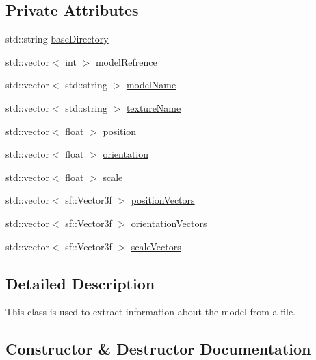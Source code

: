 \subsection*{Private Attributes}
\begin{DoxyCompactItemize}
\item 
std\+::string \hyperlink{class_model_extractor_a97d4cac0fe91a0bb91a736f780c8740a}{base\+Directory}
\item 
std\+::vector$<$ int $>$ \hyperlink{class_model_extractor_a507d1a9066e1a5eca6ccabad7a678432}{model\+Refrence}
\item 
std\+::vector$<$ std\+::string $>$ \hyperlink{class_model_extractor_a0167c9a9eab2cd5478f4399a55328db6}{model\+Name}
\item 
std\+::vector$<$ std\+::string $>$ \hyperlink{class_model_extractor_ab1c441c2915f84360bc00b331b301eb2}{texture\+Name}
\item 
std\+::vector$<$ float $>$ \hyperlink{class_model_extractor_a561a692a6b37b8ef36020b918a63066c}{position}
\item 
std\+::vector$<$ float $>$ \hyperlink{class_model_extractor_ae0be066e55d4910fa79d7b3da45100d0}{orientation}
\item 
std\+::vector$<$ float $>$ \hyperlink{class_model_extractor_ae9815e4d0f6783e6ba92961956c7d932}{scale}
\item 
std\+::vector$<$ sf\+::\+Vector3f $>$ \hyperlink{class_model_extractor_a9427f6c960e71ea44371014aa12835cf}{position\+Vectors}
\item 
std\+::vector$<$ sf\+::\+Vector3f $>$ \hyperlink{class_model_extractor_a619bae88ba670b8652dc608a482b23fc}{orientation\+Vectors}
\item 
std\+::vector$<$ sf\+::\+Vector3f $>$ \hyperlink{class_model_extractor_a03bcd2b8bcfffe704b07583ee597b65e}{scale\+Vectors}
\end{DoxyCompactItemize}


\subsection{Detailed Description}
This class is used to extract information about the model from a file. 

\subsection{Constructor \& Destructor Documentation}
